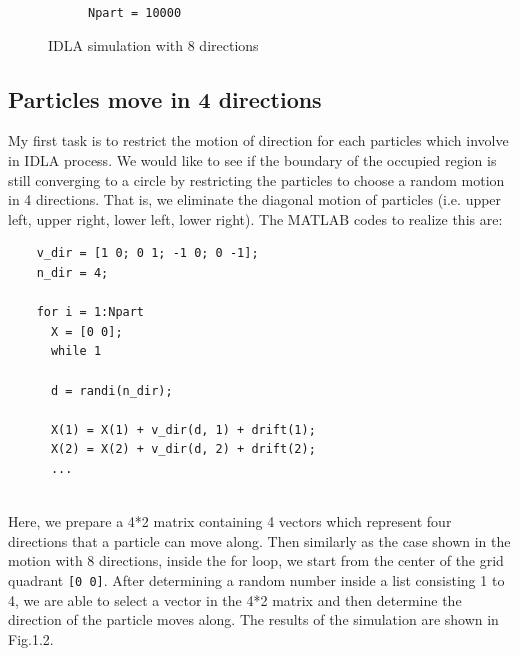 \documentclass[letterpaper]{article}
\numberwithin{equation}{section} %
\numberwithin{figure}{section} %
\numberwithin{table}{section} %
\begin{document}
\begin{figure}[htbp]
\begin{subfigure}[b]{0.3\textwidth}
		\caption{\texttt{Npart = 10000}}
		\label{8direct_Npart10000_3suW11T}
	\end{subfigure}
	\caption{IDLA simulation with 8 directions}
	\label{IDLA simulation with 8 directions}
\end{figure}
	



\subsection{Particles move in 4 directions}
My first task is to restrict the motion of direction for each particles which involve in IDLA process. We would like to see if the boundary of the occupied region is still converging to a circle by restricting the particles to choose a random motion in 4 directions. That is, we eliminate the diagonal motion of particles (i.e. upper left, upper right, lower left, lower right). The MATLAB codes to realize this are:

\begin{lstlisting}
    v_dir = [1 0; 0 1; -1 0; 0 -1];
    n_dir = 4;
    
    for i = 1:Npart
      X = [0 0];
      while 1
    
      d = randi(n_dir);
    
      X(1) = X(1) + v_dir(d, 1) + drift(1); 
      X(2) = X(2) + v_dir(d, 2) + drift(2);
      ...
      
\end{lstlisting}

\noindent
Here, we prepare a 4*2 matrix containing 4 vectors which represent four directions that a particle can move along. Then similarly as the case shown in the motion with 8 directions, inside the for loop, we start from the center of the grid quadrant \texttt{[0 0]}. After determining a random number inside a list consisting 1 to 4, we are able to select a vector in the 4*2 matrix and then determine the direction of the particle moves along. The results of the simulation are shown in Fig.1.2.

%	
%	
%	
\end{document}
